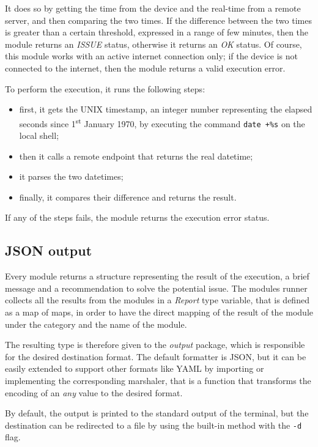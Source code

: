 It does so by getting the time from the device and the real-time from a remote server, and then comparing the two times. If the difference between the two times is greater than a certain threshold, expressed in a range of few minutes, then the module returns an \textit{ISSUE} status, otherwise it returns an \textit{OK} status. Of course, this module works with an active internet connection only; if the device is not connected to the internet, then the module returns a valid execution error.

To perform the execution, it runs the following steps:
\begin{itemize}
  \item first, it gets the UNIX timestamp, an integer number representing the elapsed seconds since 1\textsuperscript{st} January 1970, by executing the command \texttt{date +\%s} on the local shell;
  \item then it calls a remote endpoint that returns the real datetime;
  \item it parses the two datetimes;
  \item finally, it compares their difference and returns the result.
\end{itemize}

If any of the steps fails, the module returns the execution error status.


\subsection{JSON output}
\label{sec:json-output}

Every module returns a structure representing the result of the execution, a brief message and a recommendation to solve the potential issue. The modules runner collects all the results from the modules in a \textit{Report} type variable, that is defined as a map of maps, in order to have the direct mapping of the result of the module under the category and the name of the module.

The resulting type is therefore given to the \textit{output} package, which is responsible for the desired destination format. The default formatter is JSON, but it can be easily extended to support other formats like YAML by importing or implementing the corresponding marshaler, that is a function that transforms the encoding of an \textit{any} value to the desired format.

By default, the output is printed to the standard output of the terminal, but the destination can be redirected to a file by using the built-in method with the \texttt{-d} flag.

